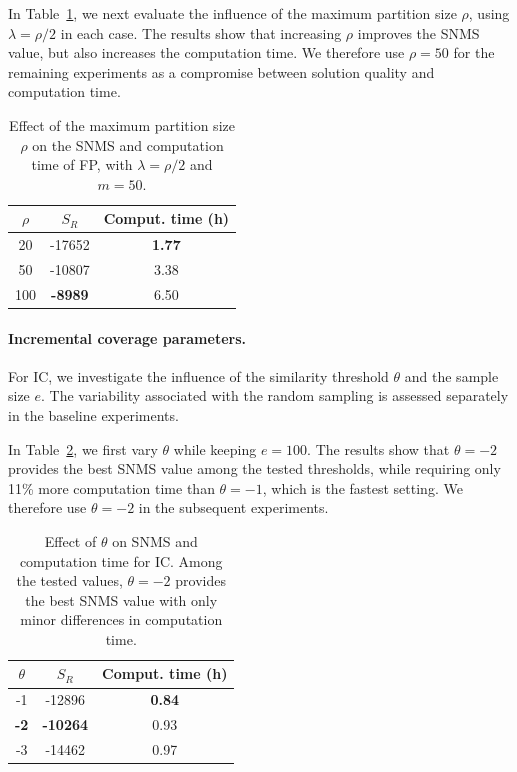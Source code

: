 \documentclass{ieeeaccess}
\newcommand{\representativeamount}{m}
\newcommand{\maxpartitionsize}{\rho}
\newcommand{\threshold}{\theta}
\newcommand{\samplesize}{e}
\newcommand{\reductionfactor}{\lambda}
\newcommand{\partitioning}{FP\xspace}
\newcommand{\inclusion}{IC\xspace}
\begin{document}
In Table~\ref{tab:rho}, we next evaluate the influence of the maximum partition size $\maxpartitionsize$, using $\reductionfactor=\maxpartitionsize/2$ in each case. The results show that increasing $\maxpartitionsize$ improves the SNMS value, but also increases the computation time. We therefore use $\maxpartitionsize=50$ for the remaining experiments as a compromise between solution quality and computation time.
\begin{table}[htbp]
    \centering \normalsize
    \begin{tabular}{ |c|c|c| } 
     \hline
      $\maxpartitionsize$ & $S_R$ &
     {Comput. time (h)}  \\
     \hline
     20 & -17652 & \textbf{1.77} \\ 
     50 & -10807 & 3.38 \\ 
     100 & \textbf{-8989} & 6.50 \\ 
     \hline
    \end{tabular}
\caption{\label{tab:rho}
Effect of the maximum partition size $\maxpartitionsize$ on the SNMS and computation time of \partitioning, with $\reductionfactor=\maxpartitionsize/2$ and $\representativeamount=50$.}
\end{table}

\paragraph*{Incremental coverage parameters.}

For \inclusion, we investigate the influence of the similarity threshold $\threshold$ and the sample size $\samplesize$. 
The variability associated with the random sampling is assessed separately in the
baseline experiments.

In Table~\ref{tab:theta}, we first vary $\threshold$ while keeping $\samplesize=100$. The results show that $\threshold=-2$ provides the best SNMS value among the tested thresholds, while requiring only 11\% more computation time than $\threshold=-1$, which is the fastest setting. We therefore use $\threshold=-2$ in the subsequent experiments.
\begin{table}[htbp]
    \centering \normalsize
    \begin{tabular}{ |c|c|c| } 
     \hline
     $\threshold$ & $S_R$ &
     {Comput. time (h)} \\
     \hline
     -1 & -12896 & \textbf{0.84} \\
     \textbf{-2} & \textbf{-10264} & 0.93 \\ 
     -3 & -14462 & 0.97 \\ 
     \hline
    \end{tabular}
\caption{\label{tab:theta}Effect of $\threshold$ on SNMS and computation time for \inclusion. Among the tested values, $\threshold=-2$ provides the best SNMS value with only minor differences in computation time.}
\end{table}
\end{document}
